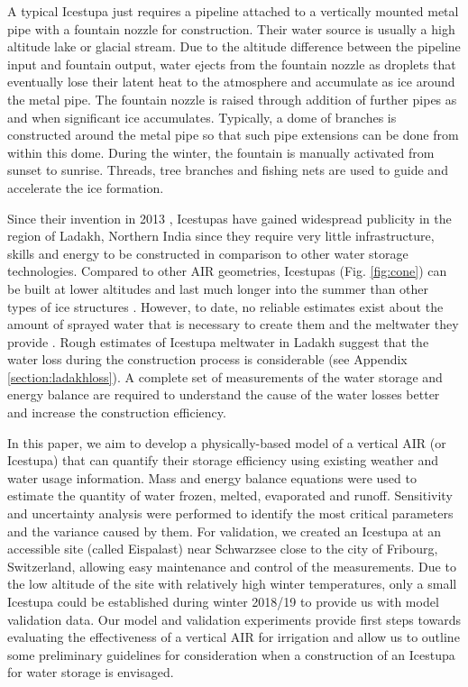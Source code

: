 \documentclass[utf8]{frontiersSCNS} %
\begin{document}
A typical Icestupa just requires a pipeline attached to a vertically mounted metal pipe with a fountain nozzle for
construction. Their water source is usually a high altitude lake or glacial stream. Due to the altitude difference
between the pipeline input and fountain output, water ejects from the fountain nozzle as droplets that eventually lose
their latent heat to the atmosphere and accumulate as ice around the metal pipe. The fountain nozzle is raised through
addition of further pipes as and when significant ice accumulates. Typically, a dome of branches is constructed around
the metal pipe so that such pipe extensions can be done from within this dome. During the winter, the fountain is
manually activated from sunset to sunrise. Threads, tree branches and fishing nets are used to guide and accelerate the
ice formation.

Since their invention in 2013 \citep{campaign}, Icestupas have gained widespread publicity in the region of Ladakh,
Northern India since they require very little infrastructure, skills and energy to be constructed in comparison to
other water storage technologies. Compared to other AIR geometries, Icestupas (Fig.  \ref{fig:cone}) can be built at
lower altitudes and last much longer into the summer than other types of ice structures \citep{campaign}. However, to
date, no reliable estimates exist about the amount of sprayed water that is necessary to create them and the meltwater
they provide \citep{Nusser_2018}. Rough estimates of Icestupa meltwater in Ladakh suggest that the water loss during
the construction process is considerable (see Appendix \ref{section:ladakhloss}). A complete set of measurements of the
water storage and energy balance are required to understand the cause of the water losses better and increase the
construction efficiency.
 
In this paper, we aim to develop a physically-based model of a vertical AIR (or Icestupa) that can quantify their
storage efficiency using existing weather and water usage information. Mass and energy balance equations were used to
estimate the quantity of water frozen, melted, evaporated and runoff. Sensitivity and uncertainty analysis were
performed to identify the most critical parameters and the variance caused by them. For validation, we created an
Icestupa at an accessible site (called Eispalast) near Schwarzsee close to the city of Fribourg, Switzerland, allowing
easy maintenance and control of the measurements. Due to the low altitude of the site with relatively high winter
temperatures, only a small Icestupa could be established during winter 2018/19 to provide us with model validation
data. Our model and validation experiments provide first steps towards evaluating the effectiveness of a vertical AIR
for irrigation and allow us to outline some preliminary guidelines for consideration when a construction of an Icestupa
for water storage is envisaged. 
\end{document}

